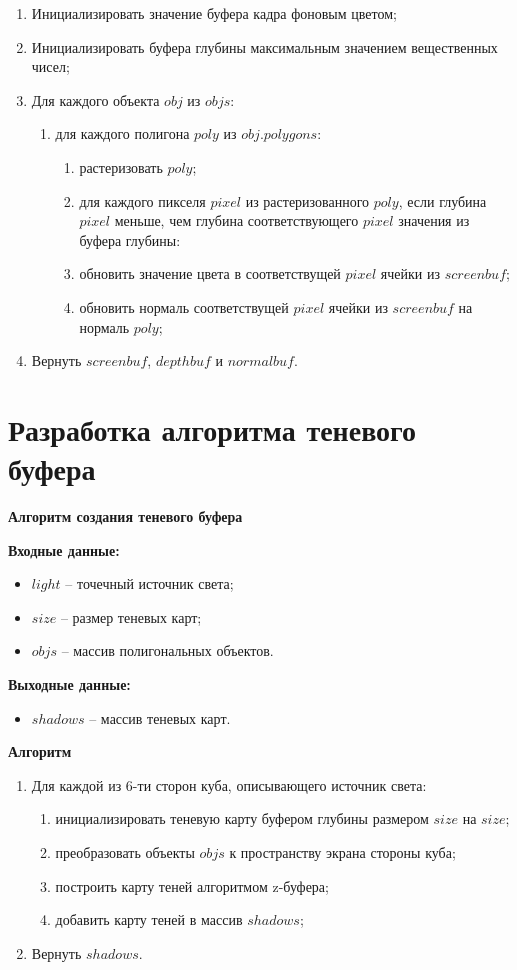 \begin{enumerate}
	\item Инициализировать значение буфера кадра фоновым цветом;
	\item  Инициализировать буфера глубины максимальным значением вещественных чисел;
	\item Для каждого объекта $obj$ из $objs$:
	\begin{enumerate}
		\item для каждого полигона $poly$ из $obj.polygons$:
		\begin{enumerate}
			\item растеризовать $poly$;
			\item для каждого пикселя $pixel$ из растеризованного $poly$, если глубина $pixel$ меньше, чем глубина соответствующего $pixel$ значения из буфера глубины:
			\item обновить значение цвета в соответствущей $pixel$ ячейки из $screenbuf$;
			\item обновить нормаль соответствущей $pixel$ ячейки из $screenbuf$ на нормаль $poly$;
		\end{enumerate}
	\end{enumerate}
	\item Вернуть $screenbuf$, $depthbuf$ и $normalbuf$.
\end{enumerate}

\section{Разработка алгоритма теневого буфера}

\textbf{Алгоритм создания теневого буфера}

\textbf{Входные данные:}
\begin{itemize}
	\item $light$ -- точечный источник света;
	\item $size$ -- размер теневых карт;
	\item $objs$ -- массив полигональных объектов.
\end{itemize}

\textbf{Выходные данные:}
\begin{itemize}
	\item $shadows$ -- массив теневых карт.
\end{itemize}

\textbf{Алгоритм}
\begin{enumerate}
	\item Для каждой из 6-ти сторон куба, описывающего источник света:
	\begin{enumerate}
		\item инициализировать теневую карту буфером глубины размером $size$ на $size$;
		\item преобразовать объекты $objs$ к пространству экрана стороны куба;
		\item построить карту теней алгоритмом z-буфера;
		\item добавить карту теней в массив $shadows$;
	\end{enumerate}
	\item Вернуть $shadows$.
\end{enumerate}


